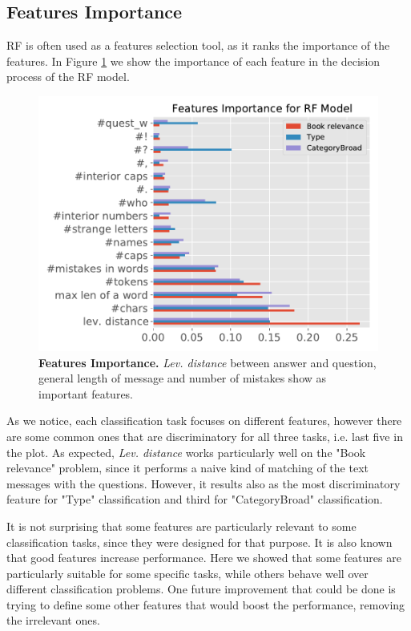 \documentclass[11pt,a4paper]{article}
\begin{document}
\subsection{Features Importance}
RF is often used as a features selection tool, as it ranks the importance of the features. In Figure \ref{fig:ft_imp_RF} we show the importance of each feature in the decision process of the RF model.

\begin{figure}[tbh]
    \centering
    \includegraphics[width = \linewidth]{../results/features_imp_RF_plot.pdf}
    \caption{\textbf{Features Importance.} \textit{Lev. distance} between answer and question, general length of message and number of mistakes show as important features.}
    \label{fig:ft_imp_RF}
\end{figure}

As we notice, each classification task focuses on different features, however there are some common ones that are discriminatory for all three tasks, i.e. last five in the plot. As expected, \textit{Lev. distance} works particularly well on the "Book relevance" problem, since it performs a naive kind of matching of the text messages with the questions. However, it results also as the most discriminatory feature for "Type" classification and third for "CategoryBroad" classification.

It is not surprising that some features are particularly relevant to some classification tasks, since they were designed for that purpose. It is also known that good features increase performance. Here we showed that some features are particularly suitable for some specific tasks, while others behave well over different classification problems. One future improvement that could be done is trying to define some other features that would boost the performance, removing the irrelevant ones.
\end{document}
